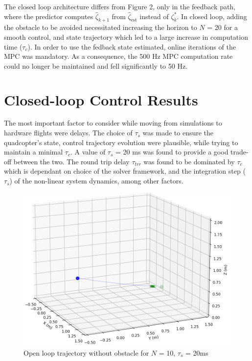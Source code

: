 \documentclass[conference]{IEEEtran}
\begin{document}
The closed loop architecture differs from Figure 2, only in the feedback path, where the predictor computes $\hat{\zeta}_{k+1}$ from $\hat{\zeta}_{\mathrm{est}}$ instead of $\zeta^*_{k}$.
In closed loop, adding the obstacle to be avoided necessitated increasing the horizon to $N$ = 20 for a smooth control, and state trajectory which led to a large increase in computation time ($\tau_c$). In order to use the fedback state estimated, online iterations of the MPC was mandatory. As a consequence, the 500 Hz MPC computation rate could no longer be maintained and fell significantly to 50 Hz.

\section{Closed-loop Control Results}\label{Section6}

The most important factor to consider while moving from simulations to hardware flights were delays. The choice of 
$\tau_s$ was made to ensure the quadcopter's state, control trajectory evolution were plausible, while trying to maintain a minimal $\tau_c$. A value of $\tau_s$ = 20 ms was found to provide a good trade-off between the two. 
The round trip delay $\tau_{trr}$ was found to be dominated by $\tau_{c}$ which is dependant on choice of the solver framework, and the integration step ($\tau_s$) of the non-linear system dynamics, among other factors.

\begin{figure}[htbp]
	\centerline{\includegraphics[scale = 0.4]{figures/Screenshot_OL_ST.png} }
	\caption{Open loop trajectory without obstacle for $N$ = 10, $\tau_s$ = 20ms}
	\label{Fig3}
\end{figure}
\end{document}
